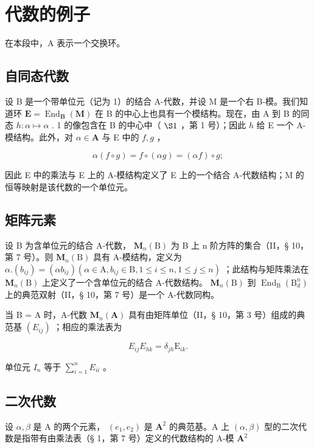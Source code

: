 \section{代数的例子}

在本段中，A 表示一个交换环。

\subsection{自同态代数}

设 B 是一个带单位元（记为 1）的结合 A-代数，并设 M 是一个右 B-模。我们知道环 \(\mathbf{E} = \operatorname{End}_{\mathbf{B}}(\mathbf{M})\) 在 B 的中心上也具有一个模结构。现在，由 A 到 B 的同态 \(h: \alpha \mapsto \alpha\) . 1 的像包含在 B 的中心中（ \(\S 1\) ，第 1 号）；因此 \(h\) 给 E 一个 A-模结构。此外，对 \(\alpha \in \mathbf{A}\) 与 E 中的 \(f, g\) ，

\[
\alpha (f \circ g) = f \circ (\alpha g) = (\alpha f) \circ g;
\]

因此 E 中的乘法与 E 上的 A-模结构定义了 E 上的一个结合 A-代数结构；M 的恒等映射是该代数的一个单位元。

\subsection{矩阵元素}

设 B 为含单位元的结合 A-代数， \(\mathbf{M}_{n}(\mathrm{B})\) 为 B 上 n 阶方阵的集合（II，§ 10，第 7 号）。则 \(\mathbf{M}_{n}(\mathrm{B})\) 具有 A-模结构，定义为 \(\alpha.(b_{ij})=(\alpha b_{ij})(\alpha\in\mathrm{A},b_{ij}\in\mathrm{B},1\leqslant i\leqslant n,1\leqslant j\leqslant n)\) ；此结构与矩阵乘法在 \(\mathbf{M}_{n}(\mathrm{B})\) 上定义了一个含单位元的结合 A-代数结构。 \(\mathbf{M}_{n}(\mathrm{B})\) 到 \(\operatorname{End}_{\mathrm{B}}(\mathrm{B}_{d}^{n})\) 上的典范双射（II，§ 10，第 7 号）是一个 A-代数同构。

当 B = A 时，A-代数 \(\mathbf{M}_{n}(\mathbf{A})\) 具有由矩阵单位（II，§ 10，第 3 号）组成的典范基 \((E_{ij})\) ；相应的乘法表为

\[
E _ {i j} E _ {h k} = \delta_ {j h} \mathrm{E} _ {i k}.\tag{1}
\]

单位元 \(I_{n}\) 等于 \(\sum_{i=1}^{n} E_{ii}\) 。

\subsection{二次代数}

设 \(\alpha, \beta\) 是 A 的两个元素， \((e_1, e_2)\) 是 \(\mathbf{A}^2\) 的典范基。A 上 \((\alpha, \beta)\) 型的二次代数是指带有由乘法表（§ 1，第 7 号）定义的代数结构的 A-模 \(\mathbf{A}^2\)

